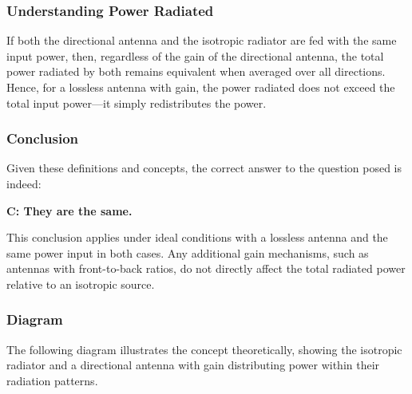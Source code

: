 \subsubsection{Understanding Power Radiated}
If both the directional antenna and the isotropic radiator are fed with the same input power, then, regardless of the gain of the directional antenna, the total power radiated by both remains equivalent when averaged over all directions. Hence, for a lossless antenna with gain, the power radiated does not exceed the total input power—it simply redistributes the power.

\subsubsection{Conclusion}
Given these definitions and concepts, the correct answer to the question posed is indeed:

\textbf{C: They are the same.}

This conclusion applies under ideal conditions with a lossless antenna and the same power input in both cases. Any additional gain mechanisms, such as antennas with front-to-back ratios, do not directly affect the total radiated power relative to an isotropic source. 

\subsubsection{Diagram}
The following diagram illustrates the concept theoretically, showing the isotropic radiator and a directional antenna with gain distributing power within their radiation patterns.

\begin{center}
\end{center}